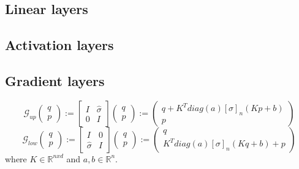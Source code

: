 \documentclass[twoside,a4paper]{article}
\begin{document}
\subsection{Linear layers}

\subsection{Activation layers}

\subsection{Gradient layers}

\begin{equation*}
	\mathcal{G}_{up} \begin{pmatrix}
		q \\
		p
	\end{pmatrix} := \begin{bmatrix}
		I & \hat{\sigma} \\
		0 & I
	\end{bmatrix} \begin{pmatrix}
		q \\
		p
	\end{pmatrix} := \begin{pmatrix}
		q + K^T diag(a) [\sigma]_n(Kp + b) \\
		p
	\end{pmatrix}
\end{equation*}
\begin{equation*}
	\mathcal{G}_{low} \begin{pmatrix}
		q \\
		p
	\end{pmatrix} := \begin{bmatrix}
		I & 0 \\
		\hat{\sigma} & I
	\end{bmatrix} \begin{pmatrix}
		q \\
		p
	\end{pmatrix} := \begin{pmatrix}
		q \\
		K^T diag(a) [\sigma]_n(Kq + b) + p
	\end{pmatrix}
\end{equation*}
where $K \in \mathbb{R}^{nxd}$ and $a,b \in \mathbb{R}^n$.
\end{document}
